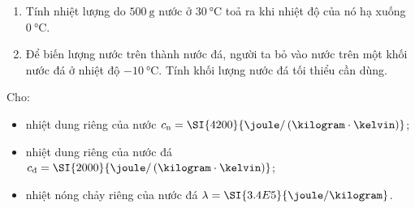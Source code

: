 \begin{ex}
\begin{enumerate}[label=\alph*)]
	\item Tính nhiệt lượng do $\SI{500}{\gram}$ nước ở $\SI{30}{\celsius}$ toả ra khi nhiệt độ của nó hạ xuống $\SI{0}{\celsius}$.
	\item Để biến lượng nước trên thành nước đá, người ta bỏ vào nước trên một khối nước đá ở nhiệt độ $\SI{-10}{\celsius}$. Tính khối lượng nước đá tối thiểu cần dùng.
\end{enumerate}
Cho:
\begin{itemize}
	\item nhiệt dung riêng của nước $c_\text{n}=\SI{4200}{\joule/\left(\kilogram\cdot\kelvin\right)}$;
	\item nhiệt dung riêng của nước đá $c_\text{đ}=\SI{2000}{\joule/\left(\kilogram\cdot\kelvin\right)}$;
	\item nhiệt nóng chảy riêng của nước đá $\lambda=\SI{3.4E5}{\joule/\kilogram}$.
\end{itemize}
\end{ex}
